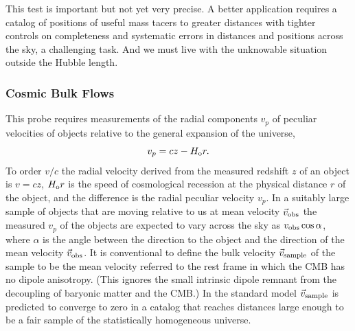 \documentclass[fleqn,usenatbib]{mnras}
\newcommand{\beq}{\begin{equation}}
\newcommand{\eeq}{\end{equation}}
\begin{document}
This test is important but not yet very precise. A better application requires a catalog of positions of useful mass tacers to greater distances with tighter controls on completeness and systematic errors in distances and positions across the sky, a challenging task. And we must live with the unknowable situation outside the Hubble length.

\subsubsection{Cosmic Bulk Flows}\label{sec:bulkflows}

This probe requires measurements of the radial components $v_p$ of peculiar velocities of objects relative to the general expansion of the universe, 
\beq
v_p = cz - H_{\rm o}r. \label{eq:peculiarvelocity}
\eeq
To order $v/c$ the radial velocity derived from the measured redshift $z$ of an object is $v =  cz$, $H_{\rm o}r$ is the speed of cosmological recession at the physical distance $r$ of the object, and the difference is the radial peculiar velocity $v_p$. In a suitably large sample of objects that are moving relative to us at mean velocity $\vec v_{\rm obs}$ the measured  $v_p$ of the objects are expected to vary across the sky as $v_{\rm obs}\cos\alpha$, where $\alpha$ is the angle between the direction to the object and the direction of the mean velocity $\vec v_{\rm obs}$. It is conventional to define the bulk velocity $\vec v_{\rm sample}$ of the sample to be the mean velocity referred to the rest frame in which the CMB has no dipole anisotropy. (This ignores the small intrinsic dipole remnant from the decoupling of baryonic matter and the CMB.) In the standard model $\vec v_{\rm sample}$ is predicted to converge to zero in a catalog that reaches distances large enough to be a fair sample of the statistically homogeneous universe. 

\end{document}
